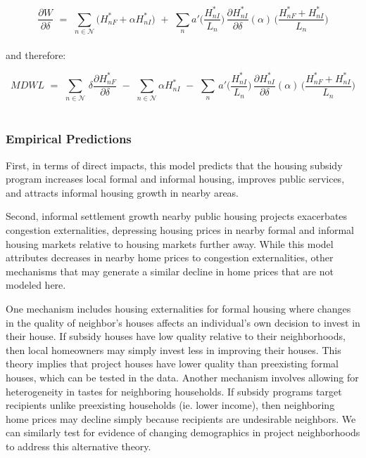 \documentclass[12pt]{article}
\begin{document}
\begin{equation*}
\frac{\partial W}{\partial\delta} \,\,=\,\, \sum_{n\in\mathcal{N}} \big( H^*_{nF} + \alpha H^*_{nI} \big)  \,\,+\,\, \sum_{n} a'\Big(\frac{H^*_{nI}}{L_n}\Big)\,\frac{\partial H^*_{nI}}{\partial \delta}(\alpha)\,\Big(\frac{H^*_{nF}+H^*_{nI}}{L_n} \Big)
\end{equation*} \\[-1.99em]

 and therefore:

\begin{equation*}
MDWL \,\,=\,\, \sum_{n\in\mathcal{N}} \,\delta\frac{\partial H^*_{nF}}{\partial \delta} \,\,-\,\, \sum_{n\in\mathcal{N}} \alpha H^*_{nI}\,\,-\,\, \sum_{n} \, a'\Big(\frac{H^*_{nI}}{L_n}\Big)\,\frac{\partial H^*_{nI}}{\partial \delta}(\alpha)\,\Big(\frac{H^*_{nF}+H^*_{nI}}{L_n} \Big)
\end{equation*} \\[-1.99em]

\subsubsection*{Empirical Predictions}

First, in terms of direct impacts, this model predicts that the housing subsidy program increases local formal and informal housing, improves public services, and attracts informal housing growth in nearby areas.  

Second, informal settlement growth nearby public housing projects exacerbates congestion externalities, depressing housing prices in nearby formal and informal housing markets relative to housing markets further away.  While this model attributes decreases in nearby home prices to congestion externalities, other mechanisms that may generate a similar decline in home prices that are not modeled here.  

One mechanism includes housing externalities for formal housing where changes in the quality of neighbor's houses affects an individual's own decision to invest in their house.  If subsidy houses have low quality relative to their neighborhoods, then local homeowners may simply invest less in improving their houses.  This theory implies that project houses have lower quality than preexisting formal houses, which can be tested in the data.  Another mechanism involves allowing for heterogeneity in tastes for neighboring households.  If subsidy programs target recipients unlike preexisting households (ie. lower income), then neighboring home prices may decline simply because recipients are undesirable neighbors.  We can similarly test for evidence of changing demographics in project neighborhoods to address this alternative theory. 
\end{document}
